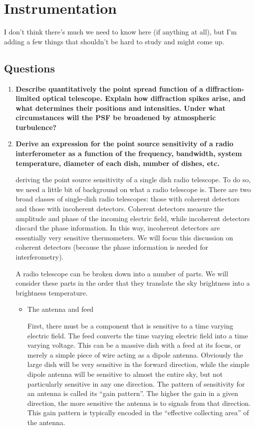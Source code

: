 \section{Instrumentation}
I don't think there's much we need to know here (if anything at all), 
but I'm adding a few things that shouldn't be hard to study and might come up.  

\subsection{Questions}
\begin{enumerate}
\item \textbf{Describe quantitatively the point spread function of a diffraction-limited optical
      telescope. Explain how diffraction spikes arise, and what determines their positions
      and intensities. Under what circumstances will the PSF be broadened by atmospheric
      turbulence?}
\item \textbf{Derive an expression for the point source sensitivity of a radio interferometer as
      a function of the frequency, bandwidth, system temperature, diameter of each dish,
      number of dishes, etc.}

       deriving the point source sensitivity of a single dish
      radio telescope.  To do so, we need a little bit of background on what a radio telescope
      is.  There are two broad classes of single-dish radio telescopes: those with coherent
      detectors and those with incoherent detectors.  Coherent detectors measure the amplitude
      and phase of the incoming electric field, while incoherent detectors discard the phase
      information.  In this way, incoherent detectors are essentially very sensitive thermometers.
      We will focus this discussion on coherent detectors (because the phase information is needed
      for interferometry).

      A radio telescope can be broken down into a number of parts.  We will consider these
      parts in the order that they translate the sky brightness into a brightness temperature.
      \begin{itemize}
      \item The antenna and feed

            First, there must be a component that is sensitive to a time varying electric
            field.  The feed converts the time varying electric field into a time varying voltage.
            This can be a massive dish with a feed at its focus, or merely a
            simple piece of wire acting as a dipole antenna.  Obviously the large dish will
            be very sensitive in the forward direction, while the simple dipole antenna will
            be sensitive to almost the entire sky, but not particularly sensitive in any one
            direction.  The pattern of sensitivity for an antenna is called its ``gain pattern''.
            The higher the gain in a given direction, the more sensitive the antenna is to signals
            from that direction.  This gain pattern is typically encoded in the ``effective
            collecting area'' of the antenna.


\end{itemize}
\end{enumerate}
